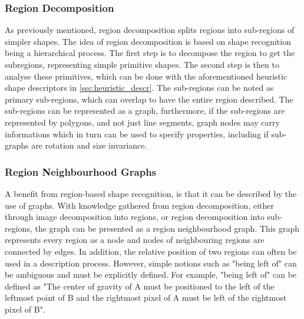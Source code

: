 \subsubsection{Region Decomposition}
As previously mentioned, region decomposition splits regions into sub-regions of simpler shapes. The idea of region decomposition is based on shape recognition being a hierarchical process. The first step is to decompose the region to get the subregions, representing simple primitive shapes. The second step is then to analyse these primitives, which can be done with the aforementioned heuristic shape descriptors in \cref{ssc:heuristic_descr}. The sub-regions can be noted as primary sub-regions, which can overlap to have the entire region described. The sub-regions can be represented as a graph, furthermore, if the sub-regions are represented by polygons, and not just line segments, graph nodes may carry informations which in turn can be used to specify properties, including if sub-graphs are rotation and size invariance.

\subsubsection{Region Neighbourhood Graphs}
A benefit from region-based shape recognition, is that it can be described by the use of graphs. With knowledge gathered from region decomposition, either through image decomposition into regions, or region decomposition into sub-regions, the graph can be presented as a region neighbourhood graph. This graph represents every region as a node and nodes of neighbouring regions are connected by edges. In addition, the relative position of two regions can often be used in a description process. However, simple notions such as "being left of" can be ambiguous and must be explicitly defined. For example, "being left of" can be defined as "The center of gravity of A must be positioned to the left of the leftmost point of B and the rightmost pixel of A must be left of the rightmost pixel of B".